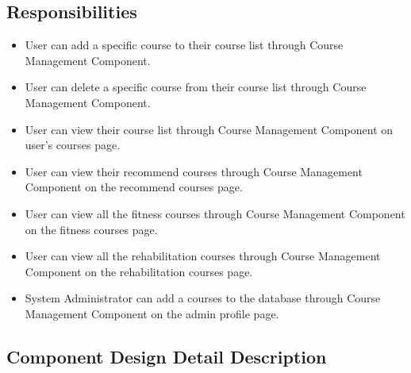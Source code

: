 \documentclass[16pt]{scrreprt}
\begin{document}
\subsection{Responsibilities}
\begin{itemize}
    \item User can add a specific course to their course list through Course Management Component.
    \item User can delete a specific course from their course list through Course Management Component.
    \item User can view their course list through Course Management Component on user's courses page.
    \item User can view their recommend courses through Course Management Component on the recommend courses page.
    \item User can view all the fitness courses through Course Management Component on the fitness courses page.
    \item User can view all the rehabilitation courses through Course Management Component on the rehabilitation courses page.
    \item System Administrator can add a courses to the database through Course Management Component on the admin profile page.
\end{itemize}

\subsection{Component Design Detail Description}
\end{document}
